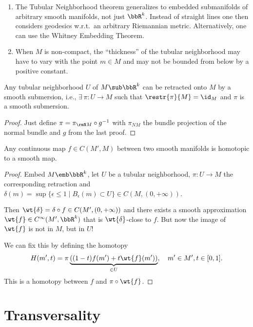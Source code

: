 \begin{rem}
\begin{enumerate}
    \item The Tubular Neighborhood theorem generalizes to embedded submanifolds of arbitrary smooth manifolds, not just $\bbR^k$. Instead of straight lines one then considers geodesics w.r.t.\ an arbitrary Riemannian metric. Alternatively, one can use the Whitney Embedding Theorem. 
    \item When $M$ is non-compact, the ``thickness'' of the tubular neighborhood may have to vary with the point $m\in M$ and may not be bounded from below by a positive constant.
\end{enumerate}
\end{rem}

\begin{thm}
    Any tubular neighborhood $U$ of $M\sub\bbR^k$ can be retracted onto $M$ by a smooth submersion, i.e., $\exists\, \pi:U\to M$ such that $\restr{\pi}{M}=\id_M$ and $\pi$ is a smooth submersion.
\end{thm}
\begin{proof}
    Just define $\pi= \pi_{\rmN M}\circ g^{-1}$ with $\pi_{NM}$ the bundle projection of the normal bundle and $g$ from the last proof.
\end{proof}

\begin{thm}\label{thm whitney approx}
Any continuous map $f\in C(M',M)$ between two smooth manifolds is homotopic to a smooth map.
\end{thm}
\begin{proof}
Embed $M\emb \bbR^k$, let $U$ be a tubular neighborhood, $\pi:U\to M$ the corresponding retraction and $\delta(m)=\sup \{\epsilon\leq 1\mid B_\epsilon (m)\subset U\}\in C(M,(0,+\infty))$. 

Then $\wt{\delta}=\delta\circ f\in C(M',(0,+\infty))$ and there exists a smooth approximation $\wt{f}\in C^\infty(M',\bbR^k)$ that is $\wt{\delta}$-close to $f$. But now the image of $\wt{f}$ is not in $M$, but in $U$!

We can fix this by defining the homotopy 
\[H(m',t)=\pi\underbrace{\left((1-t)f(m')+t\wt{f}(m')\right)}_{\in U},\quad m'\in M',t\in [0,1].\] This is a homotopy between $f$ and $\pi\circ\wt{f}$.
\end{proof}





\section{Transversality}

